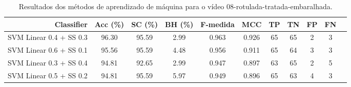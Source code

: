 \begin{table}[!htb]
\centering
\caption{Resultados dos métodos de aprendizado de máquina para o vídeo 08-rotulada-tratada-embaralhada.}
\label{tab:08-rotulada-tratada-embaralhada}
\begin{tabular}{r|c|c|c|c|c|c|c|c|c|c}
\hline\hline
Classifier & Acc (\%) & SC (\%) & BH (\%) & F-medida & MCC & TP & TN & FP & FN \\ \hline
SVM Linear 0.4 + SS 0.3 & 96.30 & 95.59 & 2.99 & 0.963 & 0.926 & 65 & 65 & 2 & 3 \\ 
SVM Linear 0.6 + SS 0.1 & 95.56 & 95.59 & 4.48 & 0.956 & 0.911 & 65 & 64 & 3 & 3 \\ 
SVM Linear 0.3 + SS 0.4 & 94.81 & 92.65 & 2.99 & 0.947 & 0.897 & 63 & 65 & 2 & 5 \\ 
SVM Linear 0.5 + SS 0.2 & 94.81 & 95.59 & 5.97 & 0.949 & 0.896 & 65 & 63 & 4 & 3 \\ 
\hline\hline
\end{tabular}
\end{table}
